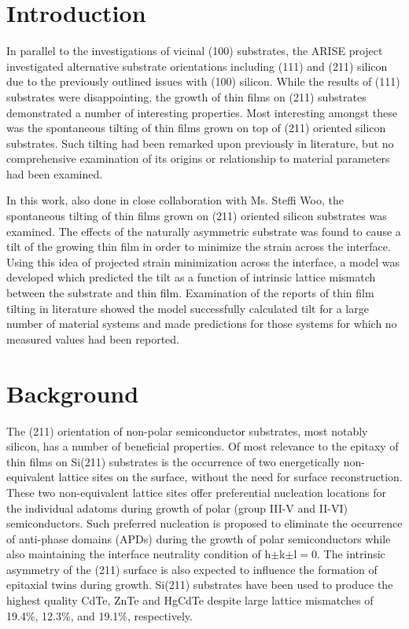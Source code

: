 \section{Introduction}\label{sec:211}
In parallel to the investigations of vicinal (100) substrates, the ARISE project investigated alternative substrate orientations including (111) and (211) silicon due to the previously outlined issues with (100) silicon. While the results of (111) substrates were disappointing, the growth of thin films on (211) substrates demonstrated a number of interesting properties. Most interesting amongst these was the spontaneous tilting of thin films grown on top of (211) oriented silicon substrates. Such tilting had been remarked upon previously in literature,  but no comprehensive examination of its origins or relationship to material parameters had been examined.

In this work, also done in close collaboration with Ms. Steffi Woo, the spontaneous 
tilting of thin films grown on (211) oriented silicon substrates was examined. The 
effects of the naturally asymmetric substrate was found to cause a tilt of the growing 
thin film in order to minimize the strain across the interface. Using this idea of 
projected strain minimization across the interface, a model was developed which predicted 
the tilt as a function of intrinsic lattice mismatch between the substrate and thin film. 
Examination of the reports of thin film tilting in literature showed the model 
successfully calculated tilt for a large number of material systems and made predictions 
for those systems for which no measured values had been reported.
\section{Background}
The (211) orientation of non-polar semiconductor substrates, most notably silicon, has a number of beneficial properties. Of most relevance to the epitaxy of thin films on Si(211) substrates is the occurrence of two energetically non-equivalent lattice sites on the surface, without the need for surface reconstruction.\cite{Wright1982} These two non-equivalent lattice sites offer preferential nucleation locations for the individual adatoms during growth of polar (group III-V and II-VI) semiconductors. Such preferred nucleation is proposed to eliminate the occurrence of anti-phase domains (APDs) during the growth of polar semiconductors\cite{Wright1982} while also maintaining the interface neutrality condition of h$\pm$k$\pm$l$=$0.\cite{Wright1982} The intrinsic asymmetry of the (211) surface is also expected to influence the formation of epitaxial twins during growth\cite{Devenyi2011}. Si(211) substrates have been used to produce the highest quality CdTe\cite{Zhao2011}, ZnTe\cite{Wang2011a} and HgCdTe\cite{Dhar1997a} despite large lattice mismatches of 19.4\%, 12.3\%, and 19.1\%, respectively. 

